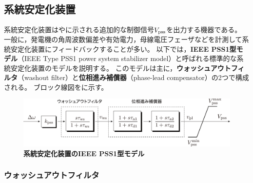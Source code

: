 \documentclass[tombow,dvipdfmx]{corona-a5-1.1}
\begin{document}
\subsection{系統安定化装置}\label{sec:pssintro}

系統安定化装置はやに示される追加的な制御信号$V_{\rm pss}$を出力する機器である。
一般に，発電機の角周波数偏差や有効電力，母線電圧フェーザなどを計測して系統安定化装置にフィードバックすることが多い。
以下では，\textbf{IEEE PSS1型モデル}（IEEE Type PSS1 power system stabilizer model）と呼ばれる標準的な系統安定化装置のモデルを説明する\cite[9.2節]{ieee2016ieee}。
このモデルは主に，\textbf{ウォッシュアウトフィルタ}（washout filter）と\textbf{位相進み補償器}（phase-lead compensator）の2つで構成される。
ブロック線図をに示す。

\begin{figure}[t]
\centering
\includegraphics[width = .99\linewidth]{figs/pss1}
\medskip
\caption{\textbf{系統安定化装置のIEEE PSS1型モデル}}
\label{fig:pss1}
\medskip
\end{figure}


\smallskip
\subsubsection{ウォッシュアウトフィルタ}
\end{document}
